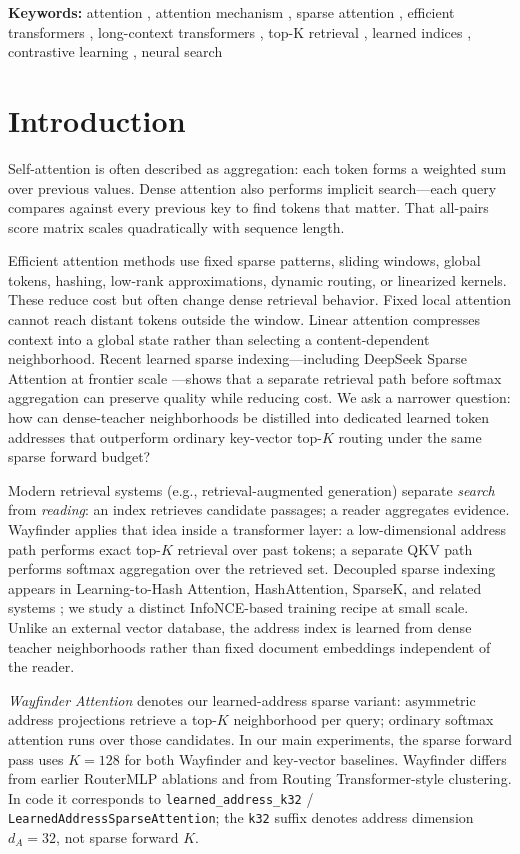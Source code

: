 \documentclass{article}
\providecommand{\keywords}[1]{\par\noindent\textbf{Keywords: }#1}
\providecommand{\and}{, }
\begin{document}
\keywords{attention \and attention mechanism \and sparse attention \and efficient transformers \and long-context transformers \and top-K retrieval \and learned indices \and contrastive learning \and neural search}

\section{Introduction}

Self-attention is often described as aggregation: each token forms a weighted sum over previous values. Dense attention also performs implicit search---each query compares against every previous key to find tokens that matter. That all-pairs score matrix scales quadratically with sequence length.

Efficient attention methods use fixed sparse patterns, sliding windows, global tokens, hashing, low-rank approximations, dynamic routing, or linearized kernels. These reduce cost but often change dense retrieval behavior. Fixed local attention cannot reach distant tokens outside the window. Linear attention compresses context into a global state rather than selecting a content-dependent neighborhood. Recent learned sparse indexing---including DeepSeek Sparse Attention at frontier scale \cite{deepseek2025v32}---shows that a separate retrieval path before softmax aggregation can preserve quality while reducing cost. We ask a narrower question: how can dense-teacher neighborhoods be distilled into dedicated learned token addresses that outperform ordinary key-vector top-$K$ routing under the same sparse forward budget?

Modern retrieval systems (e.g., retrieval-augmented generation) separate \emph{search} from \emph{reading}: an index retrieves candidate passages; a reader aggregates evidence. Wayfinder applies that idea inside a transformer layer: a low-dimensional address path performs exact top-$K$ retrieval over past tokens; a separate QKV path performs softmax aggregation over the retrieved set. Decoupled sparse indexing appears in Learning-to-Hash Attention, HashAttention, SparseK, and related systems \cite{sun2022lha,desai2025hashattention,lou2024sparsek}; we study a distinct InfoNCE-based training recipe at small scale. Unlike an external vector database, the address index is learned from dense teacher neighborhoods rather than fixed document embeddings independent of the reader.

\emph{Wayfinder Attention} denotes our learned-address sparse variant: asymmetric address projections retrieve a top-$K$ neighborhood per query; ordinary softmax attention runs over those candidates. In our main experiments, the sparse forward pass uses $K=128$ for both Wayfinder and key-vector baselines. Wayfinder differs from earlier RouterMLP ablations and from Routing Transformer-style clustering. In code it corresponds to \texttt{learned\_address\_k32} / \texttt{LearnedAddressSparseAttention}; the \texttt{k32} suffix denotes address dimension $d_A=32$, not sparse forward $K$.
\end{document}
